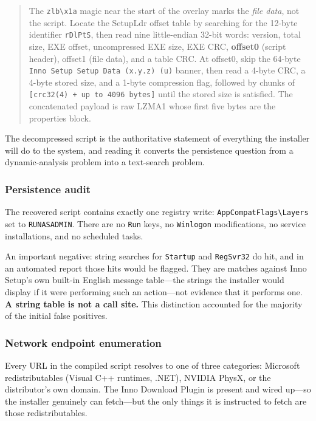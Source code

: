 \begin{quote}
The \verb|zlb\x1a| magic near the start of the overlay marks the \emph{file
data}, not the script. Locate the SetupLdr offset table by searching for the
12-byte identifier \verb|rDlPtS|, then read nine little-endian 32-bit words:
version, total size, EXE offset, uncompressed EXE size, EXE CRC,
\textbf{offset0} (script header), offset1 (file data), and a table CRC. At
offset0, skip the 64-byte \verb|Inno Setup Setup Data (x.y.z) (u)| banner, then
read a 4-byte CRC, a 4-byte stored size, and a 1-byte compression flag, followed
by chunks of \verb|[crc32(4) + up to 4096 bytes]| until the stored size is
satisfied. The concatenated payload is raw LZMA1 whose first five bytes are the
properties block.
\end{quote}

The decompressed script is the authoritative statement of everything the
installer will do to the system, and reading it converts the persistence question
from a dynamic-analysis problem into a text-search problem.

\subsubsection{Persistence audit}
The recovered script contains exactly one registry write:
\verb|AppCompatFlags\Layers| set to \verb|RUNASADMIN|. There are no \verb|Run|
keys, no \verb|Winlogon| modifications, no service installations, and no
scheduled tasks.

An important negative: string searches for \verb|Startup| and \verb|RegSvr32| do
hit, and in an automated report those hits would be flagged. They are matches
against Inno Setup's own built-in English message table---the strings the
installer would display if it were performing such an action---not evidence that
it performs one. \textbf{A string table is not a call site.} This distinction
accounted for the majority of the initial false positives.

\subsubsection{Network endpoint enumeration}
Every URL in the compiled script resolves to one of three categories: Microsoft
redistributables (Visual C++ runtimes, .NET), NVIDIA PhysX, or the distributor's
own domain. The Inno Download Plugin is present and wired up---so the installer
genuinely can fetch---but the only things it is instructed to fetch are those
redistributables.

